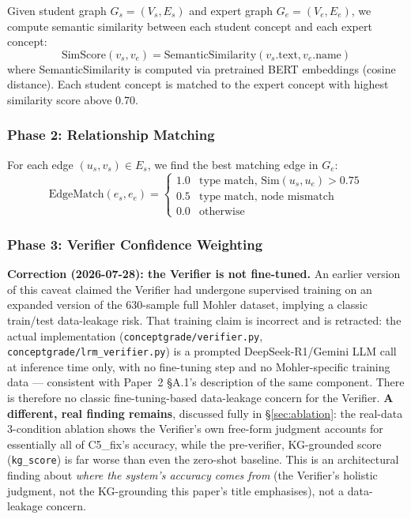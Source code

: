 \documentclass[conference]{IEEEtran}
\begin{document}
Given student graph $G_s = (V_s, E_s)$ and expert graph $G_e = (V_e, E_e)$,
we compute semantic similarity between each student concept and each expert concept:
\begin{equation}
  \text{SimScore}(v_s, v_e) = \text{SemanticSimilarity}(v_s.\text{text}, v_e.\text{name})
  \label{eq:concept_sim}
\end{equation}
where SemanticSimilarity is computed via pretrained BERT embeddings (cosine distance).
Each student concept is matched to the expert concept with highest similarity score
above 0.70.

\subsubsection{Phase 2: Relationship Matching}

For each edge $(u_s, v_s) \in E_s$, we find the best matching edge in $G_e$:
\begin{equation}
  \text{EdgeMatch}(e_s, e_e) =
  \begin{cases}
    1.0 & \text{type match, } \mathrm{Sim}(u_s,u_e)\!>\!0.75 \\
    0.5 & \text{type match, node mismatch} \\
    0.0 & \text{otherwise}
  \end{cases}
  \label{eq:edge_match}
\end{equation}

\subsubsection{Phase 3: Verifier Confidence Weighting}

\textbf{Correction (2026-07-28): the Verifier is not fine-tuned.} An
earlier version of this caveat claimed the Verifier had undergone
supervised training on an expanded version of the $630$-sample full
Mohler dataset, implying a classic train/test data-leakage risk. That
training claim is incorrect and is retracted: the actual implementation
(\texttt{conceptgrade/verifier.py}, \texttt{conceptgrade/lrm\_verifier.py})
is a prompted DeepSeek-R1/Gemini LLM call at inference time only, with
no fine-tuning step and no Mohler-specific training data --- consistent
with Paper~2 §A.1's description of the same component. There is
therefore no classic fine-tuning-based data-leakage concern for the
Verifier. \textbf{A different, real finding remains}, discussed fully
in \S\ref{sec:ablation}: the real-data 3-condition ablation shows the
Verifier's own free-form judgment accounts for essentially all of
C5\_fix's accuracy, while the pre-verifier, KG-grounded score
(\texttt{kg\_score}) is far worse than even the zero-shot baseline. This
is an architectural finding about \emph{where the system's accuracy
comes from} (the Verifier's holistic judgment, not the KG-grounding this
paper's title emphasises), not a data-leakage concern.
\end{document}
